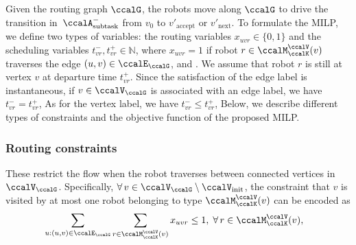\documentclass[Afour,sageh,times]{sagej}
\newcommand{\auto}[1]{\ccalA_{\text{#1}}}
\begin{document}
Given the routing graph $\ccalG$, the robots move along $\ccalG$ to drive the transition in~$\auto{subtask}^-$ from
$v_0$ to $v'_{\text{accept}}$ or $v'_{\text{next}}$. To formulate the MILP, we define two types of variables: the routing variables $x_{uvr} \in\{0, 1\}$ and the scheduling variables $t^-_{vr}, t^+_{vr} \in \mathbb{N}$, where $x_{uvr}=1$  if robot  $r\in \ccalM^\ccalV_\ccalK(v)$ traverses the edge $(u,v) \in \ccalE_\ccalG$, and . We assume that robot $r$ is still at vertex $v$ at departure time $t^+_{vr}$. Since the satisfaction of the edge label is instantaneous, if $v \in \ccalV_\ccalG$ is associated with an edge label, we have
  $t_{vr}^- = t_{vr}^+$,  As for the vertex label, we have $t_{vr}^-  \leq t_{vr}^+$,  Below, we describe  different types of constraints and the objective function of the proposed MILP.
\subsubsection{Routing constraints} These restrict the flow when the robot traverses between connected vertices in $\ccalV_\ccalG$. Specifically, $\forall\, v \in \ccalV_\ccalG\setminus\ccalV_{\text{init}}$, the constraint that  $v$ is visited by at most one robot belonging to type $\ccalM^\ccalV_{\ccalK}(v)$ can be encoded as
\begingroup\makeatletter\def\f@size{10}\check@mathfonts
\def\maketag@@@#1{\hbox{\m@th\normalsize\normalfont#1}}%
\begin{align}
   & \sum_{u:(u,v)\in \ccalE_\ccalG} \sum_{r\in \ccalM^\ccalV_{\ccalK}(v)} x_{uvr}  \leq 1, \;\forall\, r \in \ccalM^\ccalV_{\ccalK}(v), \label{eq:1}
\end{align}
\endgroup
\end{document}
